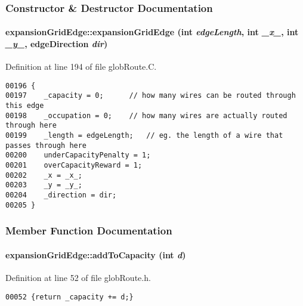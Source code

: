 \subsubsection{Constructor \& Destructor Documentation}
\label{expansionGridEdge_a0}
\paragraph{\setlength{\rightskip}{0pt plus 5cm}expansion\-Grid\-Edge::expansion\-Grid\-Edge (int {\em edge\-Length}, int {\em \_\-x\_\-}, int {\em \_\-y\_\-}, {\bf edge\-Direction} {\em dir})}\hfill



Definition at line 194 of file glob\-Route.C.\small\begin{verbatim}00196 {
00197    _capacity = 0;      // how many wires can be routed through this edge
00198    _occupation = 0;    // how many wires are actually routed through here
00199    _length = edgeLength;   // eg. the length of a wire that passes through here
00200    underCapacityPenalty = 1;
00201    overCapacityReward = 1;
00202    _x = _x_;
00203    _y = _y_;
00204    _direction = dir;
00205 }
\end{verbatim}\normalsize 


\subsubsection{Member Function Documentation}
\label{expansionGridEdge_a2}
\paragraph{\setlength{\rightskip}{0pt plus 5cm}expansion\-Grid\-Edge::add\-To\-Capacity (int {\em d})\hspace{0.3cm}{\tt  [inline]}}\hfill



Definition at line 52 of file glob\-Route.h.\small\begin{verbatim}00052 {return _capacity += d;}
\end{verbatim}\normalsize 
\label{expansionGridEdge_a1}
